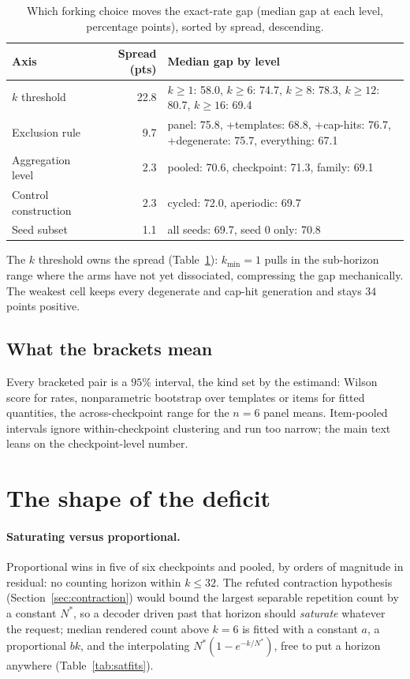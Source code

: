 \begin{table}[tp]
\centering
\caption{Which forking choice moves the exact-rate gap (median gap at each
level, percentage points), sorted by spread, descending.}
\label{tab:hier-axis}
\small
\begin{tabular}{@{}l r p{6.6cm}@{}}
\toprule
Axis & Spread (pts) & Median gap by level \\
\midrule
$k$ threshold & 22.8 & $k{\ge}1$: 58.0, $k{\ge}6$: 74.7, $k{\ge}8$: 78.3, $k{\ge}12$: 80.7, $k{\ge}16$: 69.4 \\
Exclusion rule & 9.7 & panel: 75.8, +templates: 68.8, +cap-hits: 76.7, +degenerate: 75.7, everything: 67.1 \\
Aggregation level & 2.3 & pooled: 70.6, checkpoint: 71.3, family: 69.1 \\
Control construction & 2.3 & cycled: 72.0, aperiodic: 69.7 \\
Seed subset & 1.1 & all seeds: 69.7, seed 0 only: 70.8 \\
\bottomrule
\end{tabular}
\end{table}

The $k$ threshold owns the spread (Table~\ref{tab:hier-axis}): $k_{\min}=1$ pulls in the
sub-horizon range where the arms have not yet dissociated, compressing the gap mechanically. The
weakest cell keeps every degenerate and cap-hit generation and stays $34$ points positive.

\subsection{What the brackets mean}
\label{sec:brackets}

Every bracketed pair is a $95\%$ interval, the kind set by the estimand: Wilson score for rates,
nonparametric bootstrap over templates or items for fitted quantities, the across-checkpoint
range for the $n=6$ panel means. Item-pooled intervals ignore within-checkpoint clustering and
run too narrow; the main text leans on the checkpoint-level number.

\section{The shape of the deficit}
\label{sec:shape}

\paragraph{Saturating versus proportional.} Proportional wins in five of six checkpoints and
pooled, by orders of magnitude in residual: no counting horizon within $k\le32$. The refuted
contraction hypothesis (Section~\ref{sec:contraction}) would bound the largest separable
repetition count by a constant $N^\ast$, so a decoder driven past that horizon should
\emph{saturate} whatever the request; median rendered count above $k=6$ is fitted with a
constant $a$, a proportional $bk$, and the interpolating $N^\ast(1-e^{-k/N^\ast})$, free to put
a horizon anywhere (Table~\ref{tab:satfits}).

